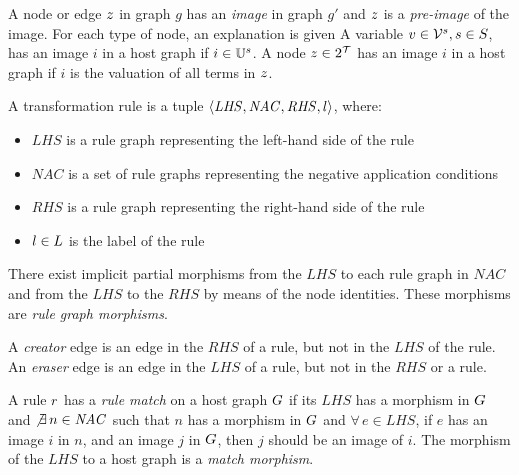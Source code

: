 \begin{definition}
A node or edge $z$ in graph $g$ has an \textit{image} in graph $g'$ and $z$ is a \textit{pre-image} of the image. For each type of node, an explanation is given  A variable $v \in \mathcal{V}^{s}, s \in S$, has an image $i$ in a host graph if $i \in \mathbb{U}^{s}$. A node $z \in 2^{\mathcal{T}}$ has an image $i$ in a host graph if $i$ is the valuation of all terms in $z$. 
\end{definition}

\vspace{5px}
\begin{definition}
A transformation rule is a tuple $\langle \mathit{LHS}, \mathit{NAC}, \mathit{RHS}, l \rangle$, where:
\begin{itemize}
  \item $\mathit{LHS}$ is a rule graph representing the left-hand side of the rule
  \item $\mathit{NAC}$ is a set of rule graphs representing the negative application conditions
  \item $\mathit{RHS}$ is a rule graph representing the right-hand side of the rule
  \item $l \in L$ is the label of the rule
\end{itemize}
There exist implicit partial morphisms from the $\mathit{LHS}$ to each rule graph in $\mathit{NAC}$ and from the $\mathit{LHS}$ to the $\mathit{RHS}$ by means of the node identities. These morphisms are \textit{rule graph morphisms}.
\end{definition}
\vspace{5px}

\begin{definition}
A \textit{creator} edge is an edge in the $\mathit{RHS}$ of a rule, but not in the $\mathit{LHS}$ of the rule. An \textit{eraser} edge is an edge in the $\mathit{LHS}$ of a rule, but not in the $\mathit{RHS}$ or a rule.
\end{definition}

\begin{definition}
A rule $r$ has a \textit{rule match} on a host graph $G$ if its $\mathit{LHS}$ has a morphism in $G$ and $\not\exists\,n \in \mathit{NAC}$ such that $n$ has a morphism in $G$ and $\forall\,e \in \mathit{LHS}$, if $e$ has an image $i$ in $n$, and an image $j$ in $G$, then $j$ should be an image of $i$. The morphism of the $\mathit{LHS}$ to a host graph is a \textit{match morphism}.
\end{definition}

